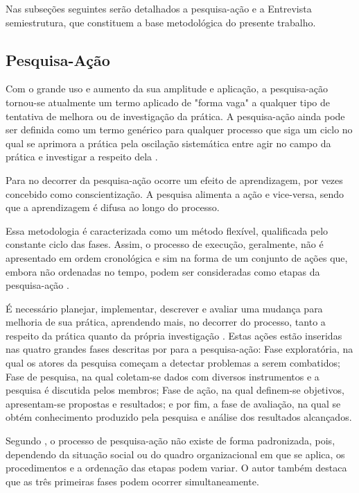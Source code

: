 Nas subseções seguintes serão detalhados a pesquisa-ação e a Entrevista semiestrutura, que constituem a base metodológica do presente trabalho.

\subsection{Pesquisa-Ação}

Com o grande uso e aumento da sua amplitude e aplicação, a pesquisa-ação tornou-se atualmente um termo aplicado de "forma vaga" a qualquer tipo de tentativa de melhora ou de investigação da prática. A pesquisa-ação ainda pode ser definida como um termo genérico para qualquer processo que siga um ciclo no qual se aprimora a prática pela oscilação sistemática entre agir no campo da prática e investigar a respeito dela \cite{tripp2005pesquisa}.

Para  no decorrer da pesquisa-ação ocorre um efeito de aprendizagem, por vezes concebido como conscientização. A pesquisa alimenta a ação e vice-versa, sendo que a aprendizagem é difusa ao longo do processo.

Essa metodologia é caracterizada como um método flexível, qualificada pelo constante ciclo das fases. Assim, o processo de execução, geralmente, não é apresentado em ordem cronológica e sim na forma de um conjunto de ações que, embora não ordenadas no tempo, podem ser consideradas como etapas da pesquisa-ação \cite{gil2002,thiollent2011metodologia}.

É necessário planejar, implementar, descrever e avaliar uma mudança para melhoria de sua prática, aprendendo mais, no decorrer do processo, tanto a respeito da prática quanto da própria investigação \cite{tripp2005pesquisa}. Estas ações estão inseridas nas quatro grandes fases descritas por  para a pesquisa-ação: Fase exploratória, na qual os atores da pesquisa começam a detectar problemas a serem combatidos; Fase de pesquisa, na qual coletam-se dados com diversos instrumentos e a pesquisa é discutida pelos membros; Fase de ação, na qual definem-se objetivos, apresentam-se propostas e resultados; e por fim, a fase de avaliação, na qual se obtém conhecimento produzido pela pesquisa e análise dos resultados alcançados.

Segundo , o processo de pesquisa-ação não existe de forma padronizada, pois, dependendo da situação social ou do quadro organizacional em que se aplica, os procedimentos e a ordenação das etapas podem variar. O autor também destaca que as três primeiras fases podem ocorrer simultaneamente.

